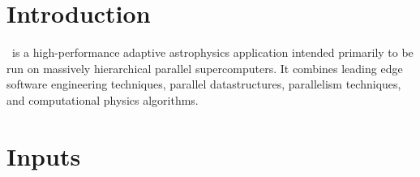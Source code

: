 \documentclass{article}
\begin{document}

\section{Introduction} \label{s:intro}

   \cello\ is a high-performance adaptive astrophysics application
   intended primarily to be run on massively hierarchical parallel
   supercomputers.  It combines leading edge software engineering
   techniques, parallel datastructures, parallelism techniques, and
   computational physics algorithms.

\section{Inputs} \label{s:inputs}
\end{document}
